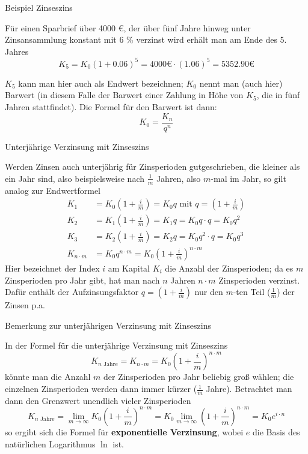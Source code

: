 \begin{frame}{Beispiel Zinseszins}
 	\begin{example}
		Für einen Sparbrief über 4000 €, der über fünf Jahre hinweg unter Zinsansammlung konstant mit 6 \% verzinst wird erhält man am Ende des 5. Jahres
		\[
		K_{5} = K_{0} \left(1 + 0.06 \right)^5 = 4000 \text{€} \cdot \left( 1.06 \right)^5 = 5352.90 \text{€}
		\]
	\end{example}
	\begin{bemerkung}
		$K_{5}$ kann man hier auch als Endwert bezeichnen; $K_{0}$ nennt man (auch hier) Barwert (in diesem Falle der Barwert einer Zahlung in Höhe von $K_{5}$, die in fünf Jahren stattfindet). Die Formel für den Barwert ist dann:
		\[
		K_{0} = \frac{K_{n}}{q^{n}}
		\]
	\end{bemerkung}
\end{frame}

\begin{frame}{Unterjährige Verzinsung mit Zinseszins}
	\begin{bemerkung}
		Werden Zinsen auch unterjährig für Zinsperioden gutgeschrieben, die kleiner als ein Jahr sind, also beispielsweise nach $\frac{1}{m}$ Jahren, also $m$-mal im Jahr, so gilt analog zur Endwertformel
		\begin{align*}
		K_{1} & = K_{0} \left( 1 + \frac{i}{m}\right) = K_{0} q \text{ mit } q= (1+\frac{i}{m}) \\
		K_{2} & = K_{1} \left( 1 + \frac{i}{m} \right) = K_{1} q = K_{0} q \cdot q = K_{0} q^2 \\
		K_{3} & = K_{2} \left( 1 + \frac{i}{m} \right) = K_{2} q = K_{0} q^2 \cdot q= K_{0} q^3  \\
		K_{n\cdot m} & = K_{0} q^{n \cdot m} = K_{0} \left( 1+ \frac{i}{m} \right)^{n \cdot m}
		\end{align*}
		Hier bezeichnet der Index $i$ am Kapital $K_{i}$ die Anzahl der Zinsperioden; da es $m$ Zinsperioden pro Jahr gibt, hat man nach $n$ Jahren $n \cdot m$ Zinsperioden verzinst. Dafür enthält der Aufzinsungsfaktor $q = \left( 1+ \frac{i}{m} \right)$ nur den $m$-ten Teil ($\frac{1}{m}$) der Zinsen p.a.
	\end{bemerkung}
\end{frame}

\begin{frame}{Bemerkung zur unterjährigen Verzinsung mit Zinseszins}
\small{	\begin{bemerkung}
		In der Formel für die unterjährige Verzinsung mit Zinseszins
		\[
		K_{n \text{ Jahre}} = K_{n \cdot m} = K_{0} \left(  1+ \frac{i}{m}\right)^{n \cdot m}
		\]
		könnte man die Anzahl $m$ der Zinsperioden pro Jahr beliebig groß wählen; die einzelnen Zinsperioden werden dann immer kürzer ($\frac{1}{m}$ Jahre). Betrachtet man dann den Grenzwert unendlich vieler Zinsperioden
		\[
		K_{n \text{ Jahre}} = \lim_{m \to \infty} K_{0} \left(  1+ \frac{i}{m}\right)^{n \cdot m} = K_{0} \lim_{m \to \infty} \left(  1+ \frac{i}{m}\right)^{n \cdot m} = K_{0} e^{i \cdot n} 
		\]
		so ergibt sich die Formel für \textbf{exponentielle Verzinsung}, wobei $e$ die Basis des natürlichen Logarithmus $\ln$ ist.
	\end{bemerkung}}
\end{frame}

